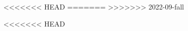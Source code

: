 \documentclass{../../oss-apphys-exam}
\begin{document}
\newpage


<<<<<<< HEAD
=======
>>>>>>> 2022-09-fall

  
%
%    
%    
%    

<<<<<<< HEAD
  
\end{document}
